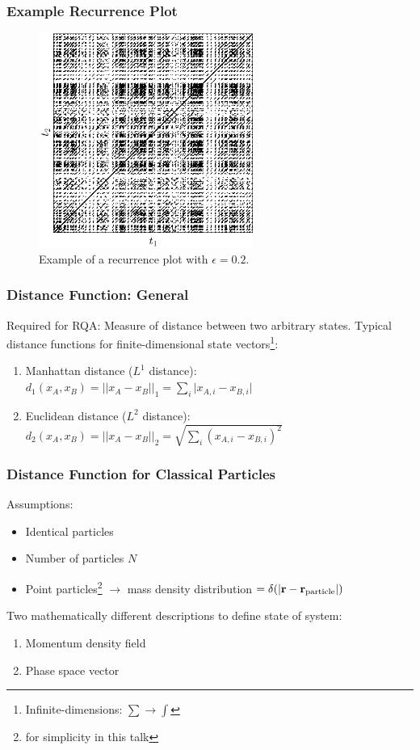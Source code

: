 \documentclass[9pt, english]{beamer}
\begin{document}
\begin{frame}[fragile]
\frametitle{Example Recurrence Plot}
\begin{figure}
\centering
\includegraphics[width=0.625\textwidth]{recurrence_plot_example.png}
\caption{Example of a recurrence plot with \(\epsilon=0.2\).}
\end{figure}
\end{frame}

\begin{frame}
\frametitle{Distance Function: General}
Required for RQA: Measure of distance between two arbitrary states.
Typical distance functions for finite-dimensional state vectors\footnote{Infinite-dimensions: \(\sum \rightarrow \int\)}:
\begin{enumerate}
 \item Manhattan distance (\(L^1\) distance): \(d_1(x_A,x_B) = \lvert \lvert x_A - x_B \rvert \rvert_1 = \sum_i{\lvert x_{A,i} - x_{B,i}\rvert}\)
 \item Euclidean distance (\(L^2\) distance): \(d_2(x_A,x_B) = \lvert \lvert x_A - x_B \rvert \rvert_2 = \sqrt{\sum_i{(x_{A,i} - x_{B,i})^2}}\)
\end{enumerate}
\end{frame}

\begin{frame}
\frametitle{Distance Function for Classical Particles}
Assumptions:
\begin{itemize}
 \item Identical particles
 \item Number of particles \(N\)
 \item Point particles\footnote{for simplicity in this talk} \(\rightarrow\) mass density distribution \( = \delta(\lvert \vb{r} - \vb{r}_{\text{particle}} \rvert)\)
\end{itemize}
Two mathematically different descriptions to define state of system:
\begin{enumerate}
 \item Momentum density field
 \item Phase space vector
\end{enumerate}
\end{frame}
\end{document}
